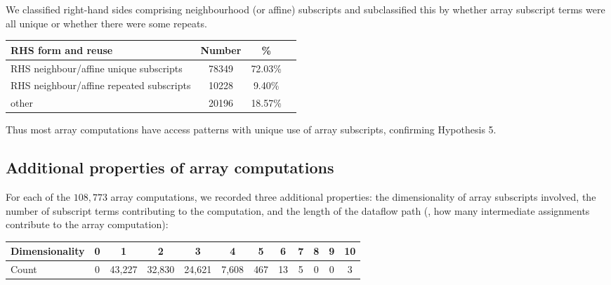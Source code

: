 %
We classified right-hand sides comprising neighbourhood (or
affine) subscripts and subclassified this by whether array subscript terms were
all unique or whether there were some repeats.
%
\begin{center}
\begin{tabular}{l|S[table-format=4]S[table-format=2.2]S[table-format=4]}
\textbf{RHS form and reuse} & \textbf{Number} & \% \\ \hline
RHS neighbour/affine unique subscripts      & 78349     & 72.03\%  \\\hline
RHS neighbour/affine repeated subscripts   & 10228     & 9.40\%  \\\hline
other                             & 20196     & 18.57\%  %
\end{tabular}
\end{center}
%
Thus most array computations have access patterns with
unique use of array subscripts, confirming Hypothesis 5.

\subsection{Additional properties of array computations}
\label{subsec:additional-data}

\noindent
For each of the $108,773$ array computations, we recorded three
additional properties: the dimensionality of array
subscripts involved, %
the number of subscript terms contributing to the computation, and the
length of the dataflow path (\ie{}, how many intermediate assignments
contribute to the array computation):%

\setlength{\tabcolsep}{0.25em}
\begin{center}
\begin{tabular}{l|ccccccccccc}
  \textbf{Dimensionality} & 0 & 1     & 2     & 3     & 4    & 5   & 6 & 7 & 8 & 9 & 10 \\\hline
  Count                   & 0 & 43,227 & 32,830 & 24,621 & 7,608 & 467 & 13 & 5 & 0 & 0 & 3
  \end{tabular}
\end{center}


